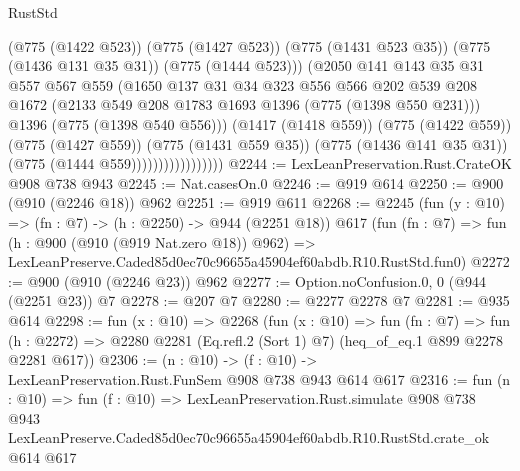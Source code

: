 \begin{lexlean}{RustStd}
\begin{coremodule}
                                  (@775 (@1422 @523))
                                  (@775 (@1427 @523))
                                  (@775 (@1431 @523 @35))
                                  (@775 (@1436 @131 @35 @31))
                                  (@775 (@1444 @523)))
                                (@2050
                                  @141
                                  @143
                                  @35
                                  @31
                                  @557
                                  @567
                                  @559
                                  (@1650
                                    @137
                                    @31
                                    @34
                                    @323
                                    @556
                                    @566
                                    @202
                                    @539
                                    @208
                                    @1672
                                    (@2133 @549 @208 @1783 @1693 @1396 (@775 (@1398 @550 @231)))
                                    @1396
                                    (@775 (@1398 @540 @556)))
                                  (@1417 (@1418 @559))
                                  (@775 (@1422 @559))
                                  (@775 (@1427 @559))
                                  (@775 (@1431 @559 @35))
                                  (@775 (@1436 @141 @35 @31))
                                  (@775 (@1444 @559)))))))))))))))))
@2244 := LexLeanPreservation.Rust.CrateOK @908 @738 @943
@2245 := Nat.casesOn.{0}
@2246 := @919 @614
@2250 := @900 (@910 (@2246 @18)) @962
@2251 := @919 @611
@2268 := @2245
    (fun (y : @10) => (fn : @7) -> (h : @2250) -> @944 (@2251 @18))
    @617
    (fun (fn : @7) =>
    fun (h : @900 (@910 (@919 Nat.zero @18)) @962) =>
    LexLeanPreserve.Caded85d0ec70c96655a45904ef60abdb.R10.RustStd.fun0)
@2272 := @900 (@910 (@2246 @23)) @962
@2277 := Option.noConfusion.{0, 0} (@944 (@2251 @23)) @7
@2278 := @207 @7
@2280 := @2277 @2278 @7
@2281 := @935 @614
@2298 := fun (x : @10) =>
  @2268
    (fun (x : @10) =>
    fun (fn : @7) =>
    fun (h : @2272) => @2280 @2281 (Eq.refl.{2} (Sort 1) @7) (heq_of_eq.{1} @899 @2278 @2281 @617))
@2306 := (n : @10) -> (f : @10) -> LexLeanPreservation.Rust.FunSem @908 @738 @943 @614 @617
@2316 := fun (n : @10) =>
  fun (f : @10) =>
  LexLeanPreservation.Rust.simulate
    @908
    @738
    @943
    LexLeanPreserve.Caded85d0ec70c96655a45904ef60abdb.R10.RustStd.crate_ok
    @614
    @617
\end{coremodule}
\end{lexlean}
